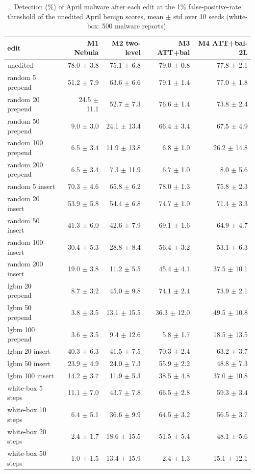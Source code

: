 \begin{table}[t]
\centering
\small
\caption{Detection (\%) of April malware after each edit at the 1\% false-positive-rate threshold of the unedited April benign scores, mean $\pm$ std over 10 seeds (white-box: 500 malware reports).}
\label{tab:T5a_attack_detection_1pct}
\begin{tabular}{lrrrr}
\toprule
edit & M1 Nebula & M2 two-level & M3 ATT+bal & M4 ATT+bal-2L \\
\midrule
unedited & 78.0 $\pm$ 3.8 & 75.1 $\pm$ 6.8 & 79.0 $\pm$ 0.8 & 77.8 $\pm$ 2.1 \\
random 5 prepend & 51.2 $\pm$ 7.9 & 63.6 $\pm$ 6.6 & 79.1 $\pm$ 1.4 & 77.0 $\pm$ 1.8 \\
random 20 prepend & 24.5 $\pm$ 11.1 & 52.7 $\pm$ 7.3 & 76.6 $\pm$ 1.4 & 73.8 $\pm$ 2.4 \\
random 50 prepend & 9.0 $\pm$ 3.0 & 24.1 $\pm$ 13.4 & 66.4 $\pm$ 3.4 & 67.5 $\pm$ 4.9 \\
random 100 prepend & 6.5 $\pm$ 3.4 & 11.9 $\pm$ 13.8 & 6.8 $\pm$ 1.0 & 26.2 $\pm$ 14.8 \\
random 200 prepend & 6.5 $\pm$ 3.4 & 7.3 $\pm$ 11.9 & 6.7 $\pm$ 1.0 & 8.0 $\pm$ 5.6 \\
random 5 insert & 70.3 $\pm$ 4.6 & 65.8 $\pm$ 6.2 & 78.0 $\pm$ 1.3 & 75.8 $\pm$ 2.3 \\
random 20 insert & 53.9 $\pm$ 5.8 & 54.4 $\pm$ 6.8 & 74.7 $\pm$ 1.0 & 71.4 $\pm$ 3.3 \\
random 50 insert & 41.3 $\pm$ 6.0 & 42.6 $\pm$ 7.9 & 69.1 $\pm$ 1.6 & 64.9 $\pm$ 4.7 \\
random 100 insert & 30.4 $\pm$ 5.3 & 28.8 $\pm$ 8.4 & 56.4 $\pm$ 3.2 & 53.1 $\pm$ 6.3 \\
random 200 insert & 19.0 $\pm$ 3.8 & 11.2 $\pm$ 5.5 & 45.4 $\pm$ 4.1 & 37.5 $\pm$ 10.1 \\
lgbm 20 prepend & 8.7 $\pm$ 3.2 & 45.0 $\pm$ 9.8 & 74.1 $\pm$ 2.4 & 73.9 $\pm$ 2.1 \\
lgbm 50 prepend & 3.8 $\pm$ 3.5 & 13.1 $\pm$ 15.5 & 36.3 $\pm$ 12.0 & 49.5 $\pm$ 10.8 \\
lgbm 100 prepend & 3.6 $\pm$ 3.5 & 9.4 $\pm$ 12.6 & 5.8 $\pm$ 1.7 & 18.5 $\pm$ 13.5 \\
lgbm 20 insert & 40.3 $\pm$ 6.3 & 41.5 $\pm$ 7.5 & 70.3 $\pm$ 2.4 & 63.2 $\pm$ 3.7 \\
lgbm 50 insert & 23.9 $\pm$ 4.9 & 24.0 $\pm$ 7.3 & 55.9 $\pm$ 2.2 & 48.8 $\pm$ 7.3 \\
lgbm 100 insert & 14.2 $\pm$ 3.7 & 11.9 $\pm$ 5.3 & 38.5 $\pm$ 4.8 & 37.0 $\pm$ 10.8 \\
white-box 5 steps & 11.1 $\pm$ 7.0 & 43.7 $\pm$ 7.8 & 66.5 $\pm$ 2.8 & 59.3 $\pm$ 3.4 \\
white-box 10 steps & 6.4 $\pm$ 5.1 & 36.6 $\pm$ 9.9 & 64.5 $\pm$ 3.2 & 56.5 $\pm$ 3.7 \\
white-box 20 steps & 2.4 $\pm$ 1.7 & 18.6 $\pm$ 15.5 & 51.5 $\pm$ 5.4 & 48.1 $\pm$ 5.6 \\
white-box 50 steps & 1.0 $\pm$ 1.5 & 13.4 $\pm$ 15.9 & 2.4 $\pm$ 1.3 & 15.1 $\pm$ 12.1 \\
\bottomrule
\end{tabular}
\end{table}
